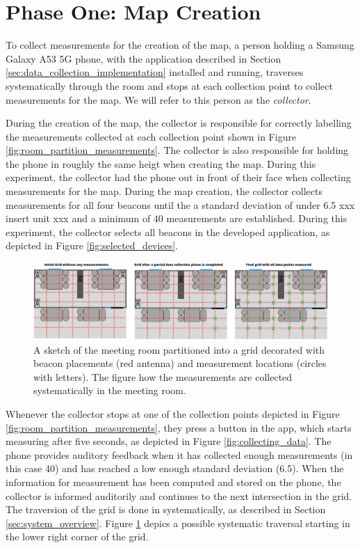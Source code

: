 \section{Phase One: Map Creation}
To collect measurements for the creation of the map, a person holding a Samsung Galaxy A53 5G phone, with the application described in Section \ref{sec:data_collection_implementation} installed and running, traverses systematically through the room and stops at each collection point to collect measurements for the map. 
We will refer to this person as the \textit{collector}.

During the creation of the map, the collector is responsible for correctly labelling the measurements collected at each collection point shown in Figure \ref{fig:room_partition_measurements}. 
The collector is also responsible for holding the phone in roughly the same heigt when creating the map. 
During this experiment, the collector had the phone out in front of their face when collecting measurements for the map. 
During the map creation, the collector collects measurements for all four beacons until the a standard deviation of under 6.5 xxx insert unit xxx and a minimum of $40$ measurements are established.
During this experiment, the collector selects all beacons in the developed application, as depicted in Figure \ref{fig:selected_devices}. %

\begin{figure}[h]
    \centering
    \includegraphics[width=\textwidth]{images/experiment_map_creation.png}
    \caption{A sketch of the meeting room partitioned into a grid decorated with beacon placements (red antenna) and measurement locations (circles with letters). The figure how the measurements are collected systematically in the meeting room.}
    \label{fig:experiment_map_creation}
\end{figure}
Whenever the collector stops at one of the collection points depicted in Figure \ref{fig:room_partition_measurements}, they press a button in the app, which starts measuring after five seconds, as depicted in Figure \ref{fig:collecting_data}.
The phone provides auditory feedback when it has collected enough measurements (in this case 40) and has reached a low enough standard deviation (6.5).
When the information for measurement has been computed and stored on the phone, the collector is informed auditorily and continues to the next intersection in the grid. 
The traversion of the grid is done in systematically, as described in Section \ref{sec:system_overview}. 
Figure \ref{fig:experiment_map_creation} depics a possible systematic traversal starting in the lower right corner of the grid. 


